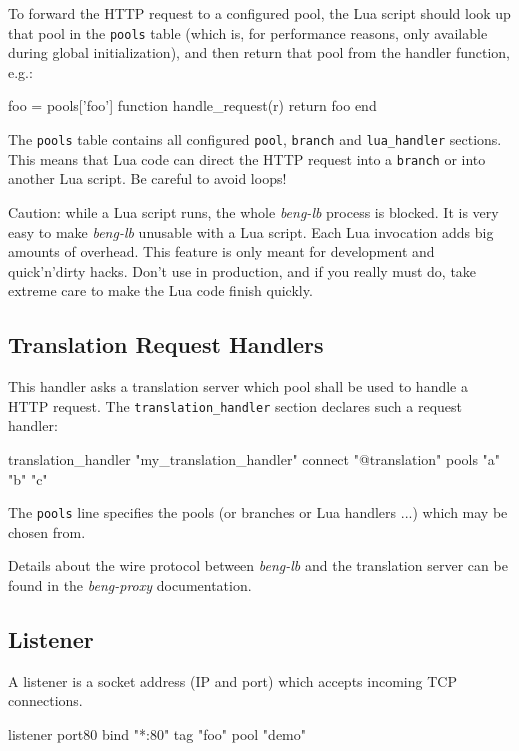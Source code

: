 \documentclass[a4paper,12pt]{article}
\begin{document}
To forward the HTTP request to a configured pool, the Lua script
should look up that pool in the \verb|pools| table (which is, for
performance reasons, only available during global initialization), and
then return that pool from the handler function, e.g.:

\begin{verbatim*}
foo = pools['foo']
function handle_request(r)
   return foo
end
\end{verbatim*}

The \verb|pools| table contains all configured \verb|pool|,
\verb|branch| and \verb|lua_handler| sections.  This means that Lua
code can direct the HTTP request into a \verb|branch| or into another
Lua script.  Be careful to avoid loops!

Caution: while a Lua script runs, the whole \emph{beng-lb} process is
blocked.  It is very easy to make \emph{beng-lb} unusable with a Lua
script.  Each Lua invocation adds big amounts of overhead.  This
feature is only meant for development and quick'n'dirty hacks.  Don't
use in production, and if you really must do, take extreme care to
make the Lua code finish quickly.

\subsection{Translation Request Handlers}

This handler asks a translation server which pool shall be used to
handle a HTTP request.  The \verb|translation_handler| section
declares such a request handler:

\begin{verbatim*}
translation_handler "my_translation_handler" {
  connect "@translation"
  pools "a" "b" "c"
}
\end{verbatim*}

The \verb|pools| line specifies the pools (or branches or Lua handlers
...) which may be chosen from.

Details about the wire protocol between \emph{beng-lb} and the
translation server can be found in the \emph{beng-proxy}
documentation.

\subsection{Listener}

A listener is a socket address (IP and port) which accepts incoming
TCP connections.

\begin{verbatim*}
listener port80 {
  bind "*:80"
  tag "foo"
  pool "demo"
}
\end{verbatim*}
\end{document}
